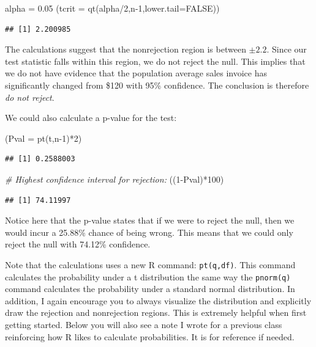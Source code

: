 \documentclass[
]{book}
\newenvironment{Shaded}{\begin{snugshade}}{\end{snugshade}}
\newcommand{\AttributeTok}[1]{\textcolor[rgb]{0.77,0.63,0.00}{#1}}
\newcommand{\CommentTok}[1]{\textcolor[rgb]{0.56,0.35,0.01}{\textit{#1}}}
\newcommand{\ConstantTok}[1]{\textcolor[rgb]{0.00,0.00,0.00}{#1}}
\newcommand{\DecValTok}[1]{\textcolor[rgb]{0.00,0.00,0.81}{#1}}
\newcommand{\FloatTok}[1]{\textcolor[rgb]{0.00,0.00,0.81}{#1}}
\newcommand{\FunctionTok}[1]{\textcolor[rgb]{0.00,0.00,0.00}{#1}}
\newcommand{\NormalTok}[1]{#1}
\newcommand{\OtherTok}[1]{\textcolor[rgb]{0.56,0.35,0.01}{#1}}
\newcommand{\SpecialCharTok}[1]{\textcolor[rgb]{0.00,0.00,0.00}{#1}}
\begin{document}
\begin{Shaded}
\begin{Highlighting}[]
\NormalTok{alpha }\OtherTok{=} \FloatTok{0.05}
\NormalTok{(}\AttributeTok{tcrit =} \FunctionTok{qt}\NormalTok{(alpha}\SpecialCharTok{/}\DecValTok{2}\NormalTok{,n}\DecValTok{{-}1}\NormalTok{,}\AttributeTok{lower.tail=}\ConstantTok{FALSE}\NormalTok{))}
\end{Highlighting}
\end{Shaded}

\begin{verbatim}
## [1] 2.200985
\end{verbatim}

The calculations suggest that the nonrejection region is between \(\pm 2.2\). Since our test statistic falls within this region, we do not reject the null. This implies that we do not have evidence that the population average sales invoice has significantly changed from \$120 with 95\% confidence. The conclusion is therefore \emph{do not reject}.

We could also calculate a p-value for the test:

\begin{Shaded}
\begin{Highlighting}[]
\NormalTok{(}\AttributeTok{Pval =} \FunctionTok{pt}\NormalTok{(t,n}\DecValTok{{-}1}\NormalTok{)}\SpecialCharTok{*}\DecValTok{2}\NormalTok{)}
\end{Highlighting}
\end{Shaded}

\begin{verbatim}
## [1] 0.2588003
\end{verbatim}

\begin{Shaded}
\begin{Highlighting}[]
\CommentTok{\# Highest confidence interval for rejection:}
\NormalTok{((}\DecValTok{1}\SpecialCharTok{{-}}\NormalTok{Pval)}\SpecialCharTok{*}\DecValTok{100}\NormalTok{)}
\end{Highlighting}
\end{Shaded}

\begin{verbatim}
## [1] 74.11997
\end{verbatim}

Notice here that the p-value states that if we were to reject the null, then we would incur a 25.88\% chance of being wrong. This means that we could only reject the null with 74.12\% confidence.

Note that the calculations uses a new R command: \texttt{pt(q,df)}. This command calculates the probability under a t distribution the same way the \texttt{pnorm(q)} command calculates the probability under a standard normal distribution. In addition, I again encourage you to always visualize the distribution and explicitly draw the rejection and nonrejection regions. This is extremely helpful when first getting started. Below you will also see a note I wrote for a previous class reinforcing how R likes to calculate probabilities. It is for reference if needed.
\end{document}
